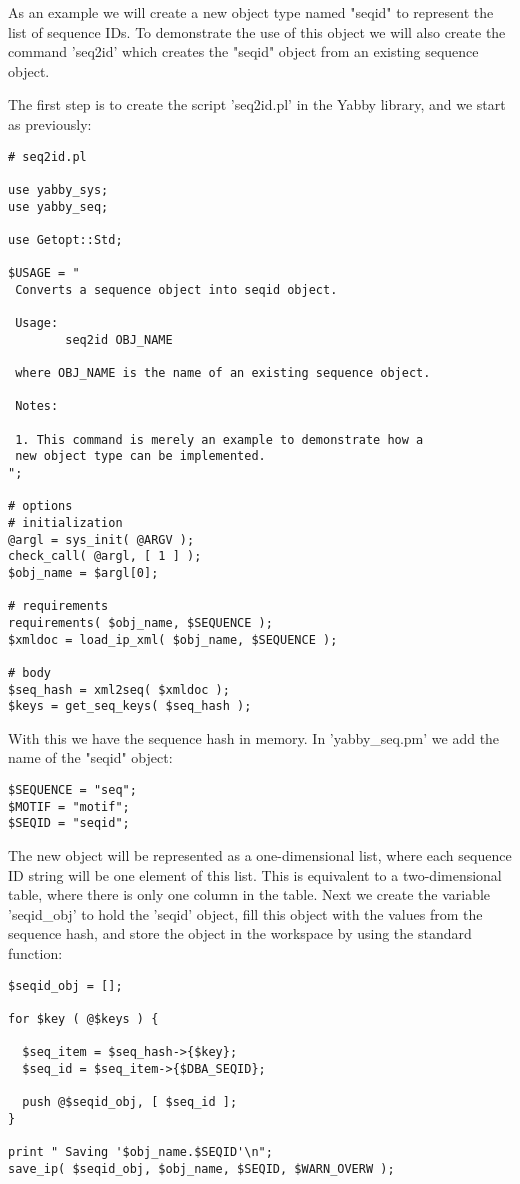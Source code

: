 As an example we will create a new object type named "seqid" to
represent the list of sequence IDs. To demonstrate the use of this
object we will also create the command 'seq2id' which creates the
"seqid" object from an existing sequence object.

The first step is to create the script 'seq2id.pl' in the Yabby
library, and we start as previously:

\begin{verbatim}
# seq2id.pl

use yabby_sys;
use yabby_seq;

use Getopt::Std;

$USAGE = "
 Converts a sequence object into seqid object.

 Usage:
        seq2id OBJ_NAME

 where OBJ_NAME is the name of an existing sequence object.

 Notes:

 1. This command is merely an example to demonstrate how a
 new object type can be implemented.
";

# options
# initialization
@argl = sys_init( @ARGV );
check_call( @argl, [ 1 ] );
$obj_name = $argl[0];

# requirements
requirements( $obj_name, $SEQUENCE );
$xmldoc = load_ip_xml( $obj_name, $SEQUENCE );

# body
$seq_hash = xml2seq( $xmldoc );
$keys = get_seq_keys( $seq_hash );
\end{verbatim}

With this we have the sequence hash in memory. In 'yabby\_seq.pm' we
add the name of the "seqid" object:

\begin{verbatim}
$SEQUENCE = "seq";
$MOTIF = "motif";
$SEQID = "seqid";
\end{verbatim}

The new object will be represented as a one-dimensional list, where
each sequence ID string will be one element of this list. This is
equivalent to a two-dimensional table, where there is only one
column in the table. Next we create the variable 'seqid\_obj' to
hold the 'seqid' object, fill this object with the values from
the sequence hash, and store the object in the workspace by using
the standard function:

\begin{verbatim}
$seqid_obj = [];

for $key ( @$keys ) {

  $seq_item = $seq_hash->{$key};
  $seq_id = $seq_item->{$DBA_SEQID};

  push @$seqid_obj, [ $seq_id ];
}

print " Saving '$obj_name.$SEQID'\n";
save_ip( $seqid_obj, $obj_name, $SEQID, $WARN_OVERW );
\end{verbatim}


